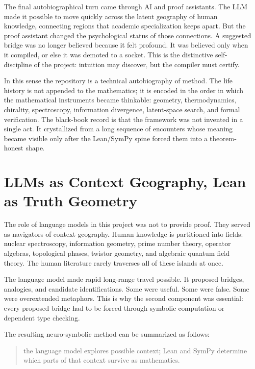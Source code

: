 The final autobiographical turn came through AI and proof assistants.  The LLM
made it possible to move quickly across the latent geography of human knowledge,
connecting regions that academic specialization keeps apart.  But the proof
assistant changed the psychological status of those connections.  A suggested
bridge was no longer believed because it felt profound.  It was believed only
when it compiled, or else it was demoted to a socket.  This is the distinctive
self-discipline of the project: intuition may discover, but the compiler must
certify.

In this sense the repository is a technical autobiography of method.  The life
history is not appended to the mathematics; it is encoded in the order in which
the mathematical instruments became thinkable: geometry, thermodynamics,
chirality, spectroscopy, information divergence, latent-space search, and formal
verification.  The black-book record is that the framework was not invented in a
single act.  It crystallized from a long sequence of encounters whose meaning
became visible only after the Lean/SymPy spine forced them into a theorem-honest
shape.

\section{LLMs as Context Geography, Lean as Truth Geometry}

The role of language models in this project was not to provide proof.  They
served as navigators of context geography.  Human knowledge is partitioned into
fields: nuclear spectroscopy, information geometry, prime number theory,
operator algebras, topological phases, twistor geometry, and algebraic quantum
field theory.  The human literature rarely traverses all of these islands at
once.

The language model made rapid long-range travel possible.  It proposed bridges,
analogies, and candidate identifications.  Some were useful.  Some were false.
Some were overextended metaphors.  This is why the second component was
essential: every proposed bridge had to be forced through symbolic computation
or dependent type checking.

The resulting neuro-symbolic method can be summarized as follows:
\begin{quote}
  the language model explores possible context; Lean and SymPy determine which
  parts of that context survive as mathematics.
\end{quote}

